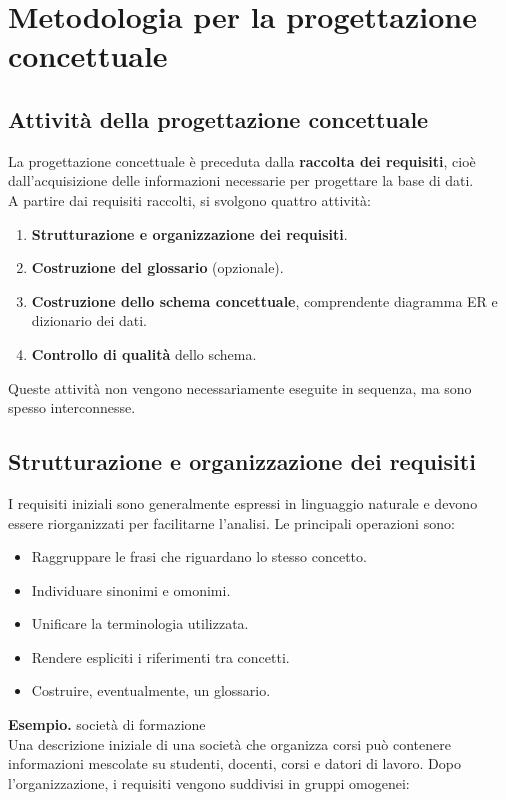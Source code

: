\section{Metodologia per la progettazione concettuale}
\subsection{Attività della progettazione concettuale}

La progettazione concettuale è preceduta dalla
\textbf{raccolta dei requisiti}, cioè dall'acquisizione
delle informazioni necessarie per progettare la base di dati.\\
A partire dai requisiti raccolti, si svolgono quattro attività:

\begin{enumerate}
    \item \textbf{Strutturazione e organizzazione dei requisiti}.
    \item \textbf{Costruzione del glossario} (opzionale).
    \item \textbf{Costruzione dello schema concettuale},
    comprendente diagramma ER e dizionario dei dati.
    \item \textbf{Controllo di qualità} dello schema.
\end{enumerate}
\noindent
Queste attività non vengono necessariamente eseguite
in sequenza, ma sono spesso interconnesse.


\subsection*{Strutturazione e organizzazione dei requisiti}

I requisiti iniziali sono generalmente espressi in
linguaggio naturale e devono essere riorganizzati
per facilitarne l'analisi.
Le principali operazioni sono:

\begin{itemize}
    \item Raggruppare le frasi che riguardano lo stesso concetto.
    \item Individuare sinonimi e omonimi.
    \item Unificare la terminologia utilizzata.
    \item Rendere espliciti i riferimenti tra concetti.
    \item Costruire, eventualmente, un glossario.
\end{itemize}
\medskip
\textcolor{verdeEsempio}{\textbf{Esempio.} }società di formazione\\
Una descrizione iniziale di una società che organizza corsi
può contenere informazioni mescolate su studenti, docenti,
corsi e datori di lavoro.
Dopo l'organizzazione, i requisiti vengono suddivisi
in gruppi omogenei:

